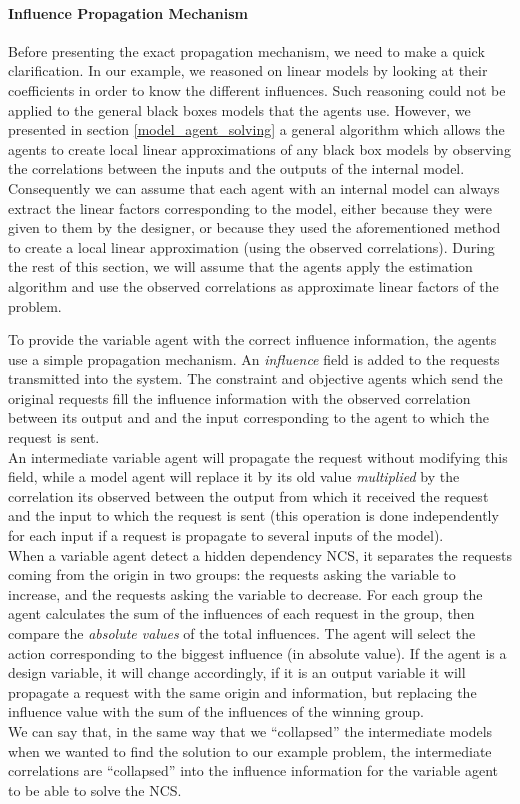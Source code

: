 \paragraph*{Influence Propagation Mechanism}
Before presenting the exact propagation mechanism, we need to make a quick clarification. In our example, we reasoned on linear models by looking at their coefficients in order to know the different influences. Such reasoning could not be applied to the general black boxes models that the agents use. However, we presented in section \ref{model_agent_solving} a general algorithm which allows the agents to create local linear approximations of any black box models by observing the correlations between the inputs and the outputs of the internal model. Consequently we can assume that each agent with an internal model can always extract the linear factors corresponding to the model, either because they were given to them by the designer, or because they used the aforementioned method to create a local linear approximation (using the observed correlations). During the rest of this section, we will assume that the agents apply the estimation algorithm and use the observed correlations as approximate linear factors of the problem.

To provide the variable agent with the correct influence information, the agents use a simple propagation mechanism. An \emph{influence} field is added to the requests transmitted into the system. The constraint and objective agents which send the original requests fill the influence information with the observed correlation between its output and and the input corresponding to the agent to which the request is sent.\\
An intermediate variable agent will propagate the request without modifying this field, while a model agent will replace it by its old value \emph{multiplied} by the correlation its observed between the output from which it received the request and the input to which the request is sent (this operation is done independently for each input if a request is propagate to several inputs of the model).\\
When a variable agent detect a hidden dependency NCS, it separates the requests coming from the origin in two groups: the requests asking the variable to increase, and the requests asking the variable to decrease. For each group the agent calculates the sum of the influences of each request in the group, then compare the \emph{absolute values} of the total influences. The agent will select the action corresponding to the biggest influence (in absolute value). If the agent is a design variable, it will change accordingly, if it is an output variable it will propagate a request with the same origin and information, but replacing the influence value with the sum of the influences of the winning group.\\
We can say that, in the same way that we \enquote{collapsed} the intermediate models when we wanted to find the solution to our example problem, the intermediate correlations are \enquote{collapsed} into the influence information for the variable agent to be able to solve the NCS.

